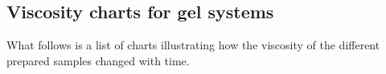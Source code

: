 \begin{appendices}
\section{Viscosity charts for gel systems}
What follows is a list of charts illustrating how the viscosity of the different prepared samples changed with time. 
\begin{figure}
    \\
\end{figure}
\end{appendices}
